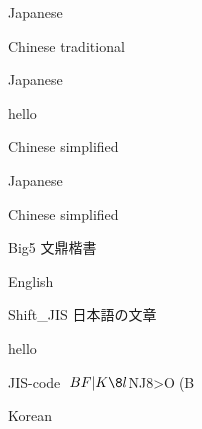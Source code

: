 \documentclass[english]{article}
\begin{document}
 
\begin{CJK}{EUC-JP}{}%
Japanese \end{CJK} \begin{CJK}{UTF8}{}Chinese traditional\end{CJK} \begin{CJK}{EUC-JP}{}
Japanese \end{CJK}
hello
\begin{CJK}{GB}{}%
Chinese simplified \end{CJK}\begin{CJK}{EUC-JP}{hei} Japanese \end{CJK} \begin{CJK}{GB}{}Chinese simplified
\end{CJK}

\begin{CJK}{Bg5}{}
Big5 文鼎楷書
\end{CJK}

%
%
English

\begin{CJK}{SJIS}{}
Shift_JIS 日本語の文章
\end{CJK}

hello

\begin{CJK}{JIS}{}
JIS-code $BF|K\8l$NJ8>O(B
\end{CJK}

\begin{CJK}{KS}{}%
Korean
\end{CJK}
\end{document}

